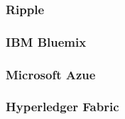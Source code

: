 \subsubsection{Ripple}

\subsubsection{IBM Bluemix}

\subsubsection{Microsoft Azue}

\subsubsection{Hyperledger Fabric}

\newpage